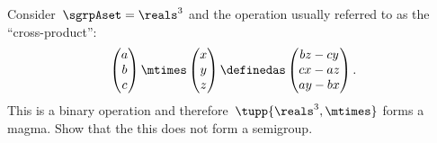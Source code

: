 \begin{exercise}
    \label{ex:cross_prod}
    Consider~$\sgrpAset=\reals^3$ and the operation usually referred to as the ``cross-product'':
    \begin{equation*}
        \begin{pmatrix}
            a \\ b\\ c
        \end{pmatrix}\mtimes \begin{pmatrix}
            x \\ y \\ z
        \end{pmatrix}\definedas
        \begin{pmatrix}
            bz-cy \\
            cx-az \\
            ay-bx
        \end{pmatrix}.
    \end{equation*}
    This is a binary operation and therefore~$\tupp{\reals^3,\mtimes}$ forms a magma.
    Show that the this does not form a semigroup.
\end{exercise}
%
